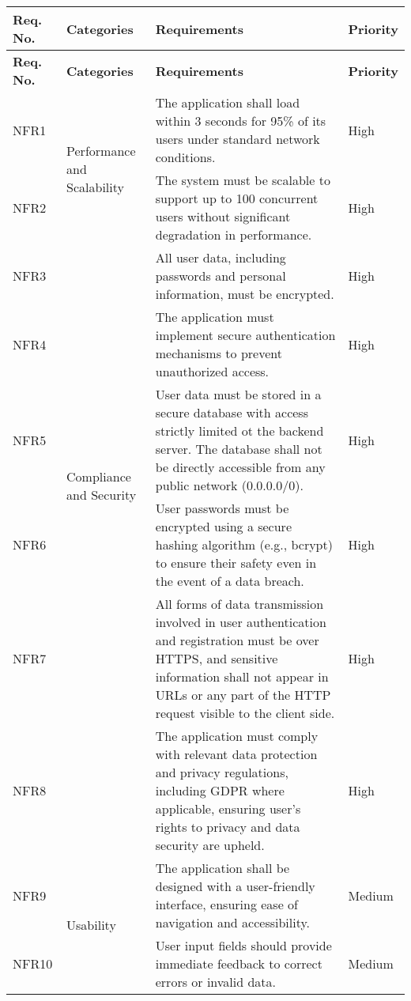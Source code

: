 \begin{longtable}{ |m{1.5cm}|m{3.5cm}|m{7cm}|m{1.5cm}| }
    \hline
    \textbf{Req. No.} & \textbf{Categories} & \textbf{Requirements} & \textbf{Priority} \\
    \hline
    \endfirsthead

    \hline
    \textbf{Req. No.} & \textbf{Categories} & \textbf{Requirements} & \textbf{Priority} \\
    \hline
    \endhead
    NFR1 & \multirow{2}{=}{Performance and Scalability} & The application shall load within 3 seconds for 95\% of its users under standard network conditions. & High \\
    \cline{1-1} \cline{3-4}
    NFR2 &  & The system must be scalable to support up to 100 concurrent users without significant degradation in performance. & High \\
    \hline
    NFR3 & \multirow{5}{=}{Compliance and Security} & All user data, including passwords and personal information, must be encrypted. & High \\
    \cline{1-1} \cline{3-4}
    NFR4 &  & The application must implement secure authentication mechanisms to prevent unauthorized access. & High \\
    \cline{1-1} \cline{3-4}
    NFR5 &  & User data must be stored in a secure database with access strictly limited ot the backend server. The database shall not be directly accessible from any public network (0.0.0.0/0). & High \\
    \cline{1-1} \cline{3-4}
    NFR6 &  & User passwords must be encrypted using a secure hashing algorithm (e.g., bcrypt) to ensure their safety even in the event of a data breach. & High \\
    \cline{1-1} \cline{3-4}
    NFR7 &  & All forms of data transmission involved in user authentication and registration must be over HTTPS, and sensitive information shall not appear in URLs or any part of the HTTP request visible to the client side. & High \\
    \cline{1-1} \cline{3-4}
    NFR8 &  & The application must comply with relevant data protection and privacy regulations, including GDPR where applicable, ensuring user's rights to privacy and data security are upheld. & High \\
    \hline
    NFR9 & \multirow{2}{=}{Usability} & The application shall be designed with a user-friendly interface, ensuring ease of navigation and accessibility. & Medium \\
    \cline{1-1} \cline{3-4}
    NFR10 &  & User input fields should provide immediate feedback to correct errors or invalid data. & Medium \\

\end{longtable}
